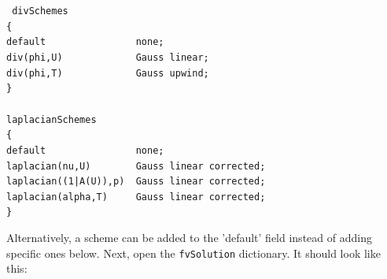 \documentclass{article}
\newcommand\tab[1][0.5cm]{\hspace*{#1}}
\begin{document}
\begin{enumerate}
	\begin{myframe}
	{\tt %
	divSchemes\\
	\{\\
	\tab default~~~~~~~~~~~~~~~~none;\\
	\tab div(phi,U)~~~~~~~~~~~~~Gauss linear; \\
	\tab div(phi,T)~~~~~~~~~~~~~Gauss upwind; \\
	\}\\
	\\
	laplacianSchemes\\
	\{\\
	\tab default~~~~~~~~~~~~~~~~none;\\
	\tab laplacian(nu,U)~~~~~~~~Gauss linear corrected;\\
	\tab laplacian((1|A(U)),p)~~Gauss linear corrected;\\
	\tab laplacian(alpha,T)~~~~~Gauss linear corrected;\\
	\}\\
		
	}
	\end{myframe}

	Alternatively, a scheme can be added to the 'default' field instead of adding specific ones below. Next, open the {\tt fvSolution} dictionary. It should look like this: 
	

\end{enumerate}
\end{document}
